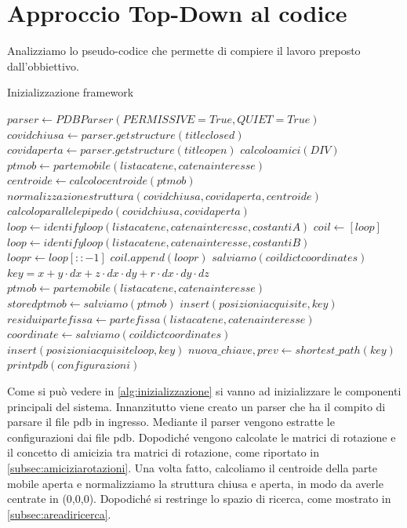 \section{Approccio Top-Down al codice}\label{sec:ApproccioTopDown}
Analizziamo lo pseudo-codice che permette di compiere il lavoro preposto dall'obbiettivo. 

\begin{algorithm}
	\caption{Inizializzazione framework}
	\label{alg:inizializzazione}
	\begin{algorithmic}
		\State $parser \gets PDBParser(PERMISSIVE=True, QUIET=True)$
		\State $covidchiusa \gets parser.getstructure(titleclosed)$
		\State $covidaperta \gets parser.getstructure(titleopen)$
		\State $calcoloamici(DIV)$
		\State $ptmob \gets partemobile(listacatene, catenainteresse)$
		\State $centroide \gets calcolocentroide(ptmob)$
		\State $normalizzazionestruttura(covidchiusa, covidaperta, centroide)$
		\State $calcoloparallelepipedo(covidchiusa, covidaperta)$
		\State $loop \gets identifyloop(listacatene, catenainteresse, costantiA)$
		\State $coil \gets [loop]$
		\State $loop \gets identifyloop(listacatene, catenainteresse, costantiB)$
		\State $loopr \gets loop[::-1]$
		\State $coil.append(loopr)$
		\State $salviamo(coildictcoordinates)$
		\State $key = x + y \cdot dx + z \cdot dx \cdot dy + r \cdot dx \cdot dy \cdot dz$
		\State $ptmob \gets partemobile(listacatene, catenainteresse)$
		\State $storedptmob \gets salviamo(ptmob)$
		\State $insert(posizioniacquisite, key)$
		\EndIf
		\State $residuipartefissa \gets partefissa(listacatene, catenainteresse)$
		\State $coordinate \gets salviamo(coildictcoordinates)$
		\State $insert(posizioniacquisiteloop, key)$
		\EndIf
		\State $nuova\_chiave, prev \gets shortest\_path(key)$
		\State $printpdb(configurazioni)$
	\end{algorithmic}
\end{algorithm}

Come si può vedere in \ref{alg:inizializzazione} si vanno ad inizializzare le componenti principali del sistema. Innanzitutto viene creato un parser che ha il compito di parsare il file pdb in ingresso. Mediante il parser vengono estratte le configurazioni dai file pdb. Dopodiché vengono calcolate le matrici di rotazione e il concetto di amicizia tra matrici di rotazione, come riportato in \ref{subsec:amiciziarotazioni}. Una volta fatto, calcoliamo il centroide della parte mobile aperta e normalizziamo la struttura chiusa e aperta, in modo da averle centrate in (0,0,0). Dopodiché si restringe lo spazio di ricerca, come mostrato in \ref{subsec:areadiricerca}.

